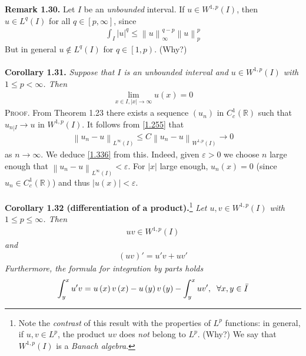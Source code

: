 \documentclass[a4paper,oneside]{article}
\numberwithin{equation}{section}
\begin{document}
\textbf{Remark 1.30.} Let $I$ be an \textit{unbounded} interval. If $u\in W^{1,p}\left(I\right)$, then $u\in L^q\left(I\right)$ for all $q\in \left[p,\infty\right]$, since
\begin{align}
\int_I {{{\left| u \right|}^q}}  \le \left\| u \right\|_\infty ^{q - p}\left\| u \right\|_p^p
\end{align}
But in general $u \notin {L^q}\left( I \right)$ for $q \in \left[1,p\right)$. (Why?)\\
\\
\textbf{Corollary 1.31.} \textit{Suppose that $I$ is an unbounded interval and $u\in W^{1,p}\left(I\right)$ with $1\le p<\infty$. Then}
\begin{align}
\label{1.336}
\mathop {\lim }\limits_{x \in I,\left| x \right| \to \infty } u\left( x \right) = 0
\end{align}
\textsc{Proof.} From Theorem 1.23 there exists a sequence $\left(u_n\right)$ in $C_c^1\left(\mathbb{R}\right)$ such that ${u_{\left. n \right|I}} \to u$ in $W^{1,p}\left(I\right)$. It follows from \eqref{1.255} that 
\begin{align}
{\left\| {{u_n} - u} \right\|_{{L^\infty }\left( I \right)}} \le C{\left\| {{u_n} - u} \right\|_{{W^{1,p}}\left( I \right)}} \to 0
\end{align}
as $n \to \infty $. We deduce \eqref{1.336} from this. Indeed, given $\varepsilon >0$ we choose $n$ large enough that ${\left\| {{u_n} - u} \right\|_{{L^\infty }\left( I \right)}} < \varepsilon $. For $\left| x \right|$ large enough, $u_n\left(x\right)=0$ (since $u_n\in C_c^1\left(\mathbb{R}\right)$) and thus $\left| {u\left( x \right)} \right| < \varepsilon $.\\
\\
\textbf{Corollary 1.32 (differentiation of a product).}\footnote{Note the \textit{contrast} of this result with the properties of $L^p$ functions: in general, if $u,v\in L^p$, the product $uv$ does \textit{not} belong to $L^p$. (Why?) We say that $W^{1,p}\left(I\right)$ is a \textit{Banach algebra}.} \textit{Let $u,v\in W^{1,p}\left(I\right)$ with $1\le p\le \infty$. Then} 
\begin{align}
uv \in {W^{1,p}}\left( I \right)
\end{align}
\textit{and}
\begin{align}
\label{1.339}
\left( {uv} \right)' = u'v + uv'
\end{align}
\textit{Furthermore, the formula for integration by parts holds}
\begin{align}	
\label{1.337}
\int_y^x {u'v}  = u\left( x \right)v\left( x \right) - u\left( y \right)v\left( y \right) - \int_y^x {uv'} ,\hspace{0.2cm}\forall x,y \in \bar I
\end{align}
\end{document}
